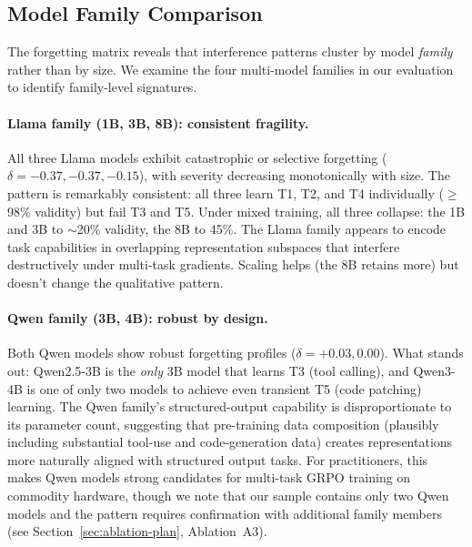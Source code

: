 \documentclass[11pt]{article}
\begin{document}
\subsection{Model Family Comparison}

The forgetting matrix reveals that interference patterns cluster by model \emph{family} rather than by size.  We examine the four multi-model families in our evaluation to identify family-level signatures.

\paragraph{Llama family (1B, 3B, 8B): consistent fragility.}
All three Llama models exhibit catastrophic or selective forgetting ($\delta = -0.37, -0.37, -0.15$), with severity decreasing monotonically with size.  The pattern is remarkably consistent: all three learn T1, T2, and T4 individually ($\geq$98\% validity) but fail T3 and T5.  Under mixed training, all three collapse: the 1B and 3B to $\sim$20\% validity, the 8B to 45\%.  The Llama family appears to encode task capabilities in overlapping representation subspaces that interfere destructively under multi-task gradients.  Scaling helps (the 8B retains more) but doesn't change the qualitative pattern.

\paragraph{Qwen family (3B, 4B): robust by design.}
Both Qwen models show robust forgetting profiles ($\delta = +0.03, 0.00$).  What stands out: Qwen2.5-3B is the \emph{only} 3B model that learns T3 (tool calling), and Qwen3-4B is one of only two models to achieve even transient T5 (code patching) learning.  The Qwen family's structured-output capability is disproportionate to its parameter count, suggesting that pre-training data composition (plausibly including substantial tool-use and code-generation data) creates representations more naturally aligned with structured output tasks.  For practitioners, this makes Qwen models strong candidates for multi-task GRPO training on commodity hardware, though we note that our sample contains only two Qwen models and the pattern requires confirmation with additional family members (see Section~\ref{sec:ablation-plan}, Ablation~A3).
\end{document}

